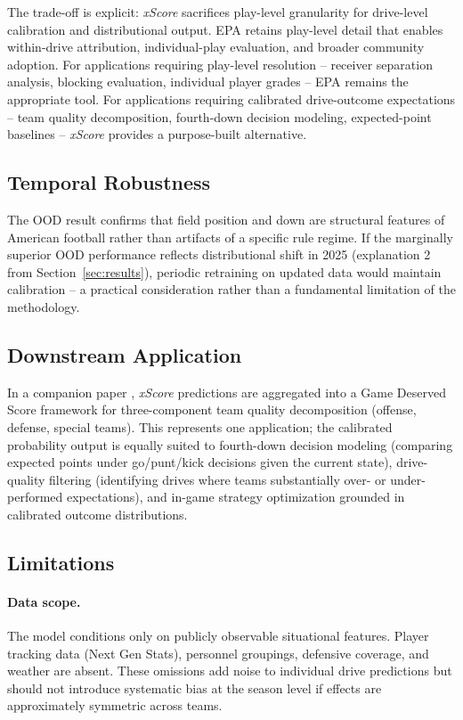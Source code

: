 \documentclass[12pt,a4paper]{article}
\newcommand{\xscore}{\textit{xScore}}
\begin{document}
The trade-off is explicit: \xscore{} sacrifices play-level granularity for drive-level calibration and distributional output. EPA retains play-level detail that enables within-drive attribution, individual-play evaluation, and broader community adoption. For applications requiring play-level resolution -- receiver separation analysis, blocking evaluation, individual player grades -- EPA remains the appropriate tool. For applications requiring calibrated drive-outcome expectations -- team quality decomposition, fourth-down decision modeling, expected-point baselines -- \xscore{} provides a purpose-built alternative.

\subsection{Temporal Robustness}

The OOD result confirms that field position and down are structural features of American football rather than artifacts of a specific rule regime. If the marginally superior OOD performance reflects distributional shift in 2025 (explanation 2 from Section~\ref{sec:results}), periodic retraining on updated data would maintain calibration -- a practical consideration rather than a fundamental limitation of the methodology.

\subsection{Downstream Application}

In a companion paper \citep{mecha2026gds}, \xscore{} predictions are aggregated into a Game Deserved Score framework for three-component team quality decomposition (offense, defense, special teams). This represents one application; the calibrated probability output is equally suited to fourth-down decision modeling (comparing expected points under go/punt/kick decisions given the current state), drive-quality filtering (identifying drives where teams substantially over- or under-performed expectations), and in-game strategy optimization grounded in calibrated outcome distributions.

\subsection{Limitations}

\paragraph{Data scope.}
The model conditions only on publicly observable situational features. Player tracking data (Next Gen Stats), personnel groupings, defensive coverage, and weather are absent. These omissions add noise to individual drive predictions but should not introduce systematic bias at the season level if effects are approximately symmetric across teams.
\end{document}
